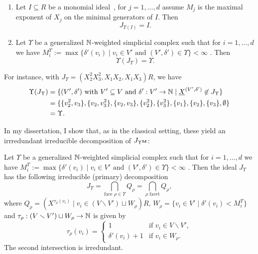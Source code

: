 \documentclass{article}
\begin{document}
\begin{theorem}
    \begin{enumerate}
        \item 
            Let $I \subseteq R$ be a monomial ideal~\cite{MR3839602}, for $j = 1,\dots,d$ assume $M_j$ is the maximal exponent of $X_j$ on the minimal generators of $I$. Then
            \[J_{\Upsilon(I)} = I.\]
        \item
            Let $\Upsilon$ be a generalized $\mathbb{N}$-weighted simplicial complex such that for $i = 1,\dots,d$ we have $M_i^\Upsilon := \max\{\delta'(v_i) \mid v_i \in V' \text{ and } (V',\delta') \in \Upsilon\} < \infty$ . Then 
            \[\Upsilon(J_{\Upsilon}) = \Upsilon.\]
    \end{enumerate}
\end{theorem}

    For instance, with $J_\Upsilon = (X_2^2X_3^2,X_1X_2,X_1X_3)R$, we have 
    \begin{align*}
        \Upsilon(J_\Upsilon) &= \{(V',\delta') \text{ with }V' \subseteq V \text{ and } \delta': V' \to \mathbb{N} \mid \underline X^{(V',\delta')} \not\in J_{\Upsilon}\} \\
        &= \{\{v_2^2,v_3\},\{v_2,v_3^2\},\{v_2,v_3\},\{v_2^2\},\{v_3^2\},\{v_1\},\{v_2\},\{v_3\},\emptyset\} \\
        &= \Upsilon.
    \end{align*}

    In my dissertation, I show that, as in the classical setting, these yield an irrredundant irreducible decomposition of $J_{\Upsilon^{\mathbf{M}}}$:

\begin{theorem} \label{JUbfMDecompositionThm}
    Let $\Upsilon$ be a generalized $\mathbb{N}$-weighted simplicial complex such that for $i = 1,\dots,d$ we have $M_i^\Upsilon := \max\{\delta'(v_i) \mid v_i \in V' \text{ and } (V',\delta') \in \Upsilon\} < \infty$ . Then the ideal $J_{\Upsilon}$ has the following irreducible (primary) decomposition 
    \[J_{\Upsilon} = \bigcap_{\text{face }\rho \in \Upsilon}Q_\rho = \bigcap_{\rho \text{ facet}} Q_\rho,\]
    where $Q_\rho = (X^{\tau_\rho(v_i)} \mid v_i \in (V \smallsetminus {V'}) \sqcup W_\rho)R$, $W_\rho = \{v_i \in V' \mid \delta'(v_i) < M_i^{\Upsilon}\}$ and $\tau_\rho: (V \smallsetminus V') \sqcup W_\rho \to \mathbb{N}$ is given by
    \[\tau_\rho(v_i) = 
        \left\{\begin{array}{ll}
                1 & \text{if }v_i \in V \smallsetminus {V'}, \\
                \delta'(v_i) + 1 & \text{if }v_i \in W_\rho.
        \end{array}\right.
    \]
    The second intersection is irredundant.
\end{theorem}
\end{document}
